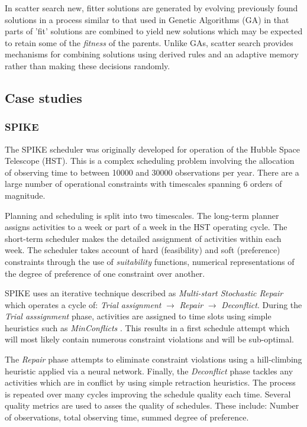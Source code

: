 \begin{description}
In scatter search \citep{glover03scatter} new, fitter solutions are generated by evolving previously found solutions in a process similar to that used in Genetic Algorithms (GA) in that parts of 'fit' solutions are combined to yield new solutions which may be expected to retain some of the \emph{fitness} of the parents. Unlike GAs, scatter search provides mechanisms for combining solutions using derived rules and an adaptive memory rather than making these decisions randomly.

\end{description}

\subsection{Case studies}
\label{sub:review_casestudy}

\subsubsection{SPIKE}
The SPIKE scheduler \citep{johnston94spike} was originally developed for operation of the Hubble Space Telescope (HST). This is a complex scheduling problem involving the allocation of observing time to between 10000 and 30000 observations per year. There are a large number of operational constraints with timescales spanning 6 orders of magnitude. 

Planning and scheduling is split into two timescales. The long-term planner assigns activities to a week or part of a week in the HST operating cycle. The short-term scheduler makes the detailed assignment of activities within each week. The scheduler takes account of hard (feasibility) and soft (preference) constraints through the use of \emph{suitability} functions, numerical representations of the degree of preference of one constraint over another. 

SPIKE uses an iterative technique described as \emph{Multi-start Stochastic Repair} which operates a cycle of: \emph{Trial assignment} $\rightarrow$ \emph{Repair} $\rightarrow$ \emph{Deconflict}. During the \emph{Trial asssignment} phase, activities are assigned to time slots using simple heuristics such as \emph{MinConflicts} \citep{minton92minconflicts}. This results in a first schedule attempt which will most likely contain numerous constraint violations and will be sub-optimal. 

The \emph{Repair} phase attempts to eliminate constraint violations using a hill-climbing heuristic applied via a neural network. Finally, the \emph{Deconflict} phase tackles any activities which are in conflict by using simple retraction heuristics. The process is repeated over many cycles improving the schedule quality each time. Several quality metrics are used to asses the quality of schedules. These include: Number of observations, total observing time, summed degree of preference. 

